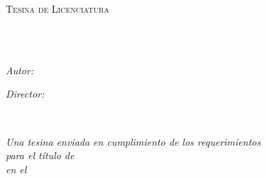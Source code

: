 \documentclass[
11pt, %
oneside, %
spanish, %
singlespacing, %
headsepline, %
]{MastersDoctoralThesis} %
\author{Juan Pablo \textsc{Rinaldi}} %
\theoremstyle{definition}
\begin{document}
\frontmatter %

\pagestyle{plain} %


\begin{titlepage}
\begin{center}

\vspace*{.06\textheight}
{\scshape\LARGE \univname\par}\vspace{1.5cm} %
\textsc{\Large Tesina de Licenciatura}\\[0.5cm] %

\HRule{} \\[0.4cm] %
{\huge \bfseries \ttitle\par}\vspace{0.4cm} %
\HRule{} \\[1.5cm] %

\begin{minipage}[t]{0.4\textwidth}
\begin{flushleft} \large
\emph{Autor:}\\
\href{https://www.linkedin.com/in/juampi}{\authorname} %
\end{flushleft}
\end{minipage}
\begin{minipage}[t]{0.4\textwidth}
\begin{flushright} \large
\emph{Director:} \\
\href{http://diaz-caro.web.unq.edu.ar/}{\supname} %
\end{flushright}
\end{minipage}\\[3cm]

\vfill

\large \textit{Una tesina enviada en cumplimiento de los requerimientos\\ para el título de \degreename}\\[0.3cm] %
\textit{en el}\\[0.4cm]
\deptname{}\\[2cm] %

\vfill

{\large \the\year}\\[4cm] %

\vfill
\end{center}
\end{titlepage}
\end{document}
